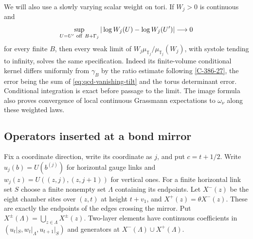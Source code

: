 \documentclass[11pt,letterpaper,reqno]{amsart}
\theoremstyle{definition}
\theoremstyle{remark}
\begin{document}
We will also use a slowly varying scalar weight on tori. If
$W_j>0$ is continuous and
\begin{equation}\label{eq:qcd-vanishing-tilt}
 \sup_{U=U'\ {\rm off}\ B+\Gamma_j}
                |\log W_j(U)-\log W_j(U')|\longrightarrow0
\end{equation}
for every finite $B$, then every weak limit of
$W_j\mu_{\mathbb T_j}/\mu_{\mathbb T_j}(W_j)$, with systole
tending to infinity, solves the same specification. Indeed its
finite-volume conditional kernel differs uniformly from $\gamma_B$
by the ratio estimate following \cref{C-386-27}, the error being
the sum of \eqref{eq:qcd-vanishing-tilt} and the torus determinant
error. Conditional integration is exact before passage to the limit.
\label{C-386-28}
The image formula also proves convergence of local continuous
Grassmann expectations to $\omega_\nu$ along these weighted laws.

\subsection{Operators inserted at a bond mirror}

Fix a coordinate direction, write its coordinate as $j$, and put
$c=t+1/2$. Write $u_j(b)=U(b^{(j)})$ for horizontal gauge links
and $w_j(z)=U((z,j),(z,j+1))$ for vertical ones. For a finite
horizontal link set $S$ choose a finite nonempty set $\Lambda$
containing its endpoints. Let $X^-(z)$ be the eight chamber sites
over $(z,t)$ at height $t+v_1$, and $X^+(z)=\theta X^-(z)$.
These are exactly the endpoints of the edges crossing the mirror.
Put $X^\pm(\Lambda)=\bigcup_{z\in\Lambda}X^\pm(z)$.
Two-layer elements have continuous coefficients in
$(u_t|_S,w_t|_\Lambda,u_{t+1}|_S)$ and generators at
$X^-(\Lambda)\cup X^+(\Lambda)$.
\end{document}
